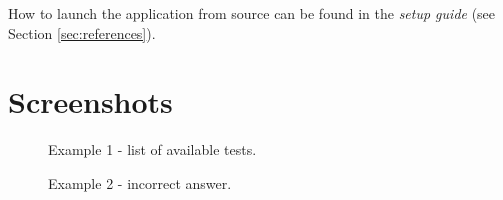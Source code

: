 \documentclass[11pt,a4paper]{article}
\begin{document}
How to launch the application from source can be found in the \textit{setup guide} (see Section \ref{sec:references}).

\section{Screenshots}

\begin{figure}[H]
    \centering
    \caption{Example 1 - list of available tests.}
    \label{fig:example1}
\end{figure}

\begin{figure}[H]
    \centering
    \caption{Example 2 - incorrect answer.}
    \label{fig:example2}
\end{figure}
\end{document}

